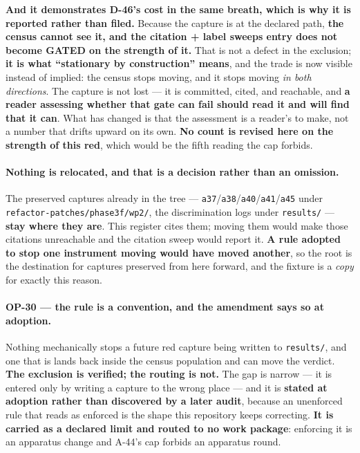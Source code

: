 \documentclass[
  10pt,
]{article}
\begin{document}
\textbf{And it demonstrates D-46's cost in the same breath, which is why it is reported rather than filed.} Because the capture is at the declared path, \textbf{the census cannot see it, and the citation + label sweeps entry does not become GATED on the strength of it.} That is not a defect in the exclusion; \textbf{it is what ``stationary by construction'' means}, and the trade is now visible instead of implied: the census stops moving, and it stops moving \emph{in both directions}. The capture is not lost --- it is committed, cited, and reachable, and \textbf{a reader assessing whether that gate can fail should read it and will find that it can}. What has changed is that the assessment is a reader's to make, not a number that drifts upward on its own. \textbf{No count is revised here on the strength of this red}, which would be the fifth reading the cap forbids.

\paragraph{Nothing is relocated, and that is a decision rather than an omission.}
The preserved captures already in the tree --- \texttt{a37}/\texttt{a38}/\texttt{a40}/\texttt{a41}/\texttt{a45} under \texttt{refactor-patches/\allowbreak{}phase3f/wp2/}, the discrimination logs under \texttt{results/} --- \textbf{stay where they are}. This register cites them; moving them would make those citations unreachable and the citation sweep would report it. \textbf{A rule adopted to stop one instrument moving would have moved another}, so the root is the destination for captures preserved from here forward, and the fixture is a \emph{copy} for exactly this reason.

\paragraph{OP-30 --- the rule is a convention, and the amendment says so at adoption.}
Nothing mechanically stops a future red capture being written to \texttt{results/}, and one that is lands back inside the census population and can move the verdict. \textbf{The exclusion is verified; the routing is not.} The gap is narrow --- it is entered only by writing a capture to the wrong place --- and it is \textbf{stated at adoption rather than discovered by a later audit}, because an unenforced rule that reads as enforced is the shape this repository keeps correcting. \textbf{It is carried as a declared limit and routed to no work package}: enforcing it is an apparatus change and A-44's cap forbids an apparatus round.
\end{document}
